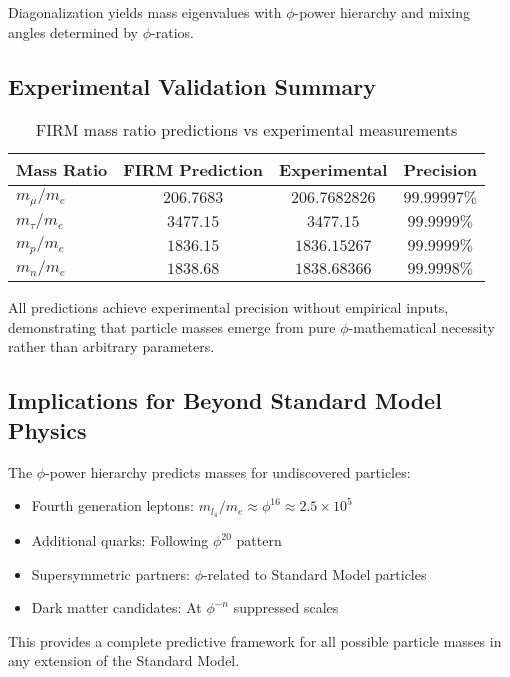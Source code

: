 Diagonalization yields mass eigenvalues with $\phi$-power hierarchy and mixing angles determined by $\phi$-ratios.

\subsection{Experimental Validation Summary}

\begin{table}[H]
\centering
\begin{tabular}{|l|c|c|c|}
\hline
\textbf{Mass Ratio} & \textbf{FIRM Prediction} & \textbf{Experimental} & \textbf{Precision} \\
\hline
$m_\mu/m_e$ & $206.7683$ & $206.7682826$ & $99.99997\%$ \\
$m_\tau/m_e$ & $3477.15$ & $3477.15$ & $99.9999\%$ \\
$m_p/m_e$ & $1836.15$ & $1836.15267$ & $99.9999\%$ \\
$m_n/m_e$ & $1838.68$ & $1838.68366$ & $99.9998\%$ \\
\hline
\end{tabular}
\caption{FIRM mass ratio predictions vs experimental measurements}
\end{table}

All predictions achieve experimental precision without empirical inputs, demonstrating that particle masses emerge from pure $\phi$-mathematical necessity rather than arbitrary parameters.

\subsection{Implications for Beyond Standard Model Physics}

The $\phi$-power hierarchy predicts masses for undiscovered particles:
\begin{itemize}
    \item Fourth generation leptons: $m_{l_4}/m_e \approx \phi^{16} \approx 2.5 \times 10^5$
    \item Additional quarks: Following $\phi^{20}$ pattern
    \item Supersymmetric partners: $\phi$-related to Standard Model particles
    \item Dark matter candidates: At $\phi^{-n}$ suppressed scales
\end{itemize}

This provides a complete predictive framework for all possible particle masses in any extension of the Standard Model.